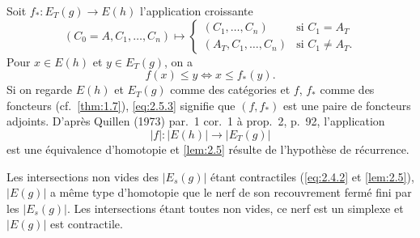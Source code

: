 \documentclass[11pt,a4paper]{article}
\theoremstyle{plain}
\theoremstyle{definition}
\begin{document}
Soit $f_* : E_T(g) \to E(h)$ l'application croissante
\begin{equation}\label{eq:2.5.2}
(C_0 = A, C_1, \ldots, C_n) \mapsto \begin{cases} (C_1, \ldots, C_n) & \text{si } C_1 = A_T \\ (A_T, C_1, \ldots, C_n) & \text{si } C_1 \not= A_T. \end{cases}
\tag{2.5.2}
\end{equation}
Pour $x \in E(h)$ et $y \in E_T(g)$, on a
\begin{equation}\label{eq:2.5.3}
f(x) \leq y \iff x \leq f_*(y).
\tag{2.5.3}
\end{equation}
Si on regarde $E(h)$ et $E_T(g)$ comme des cat\'egories et $f$, $f_*$ comme des foncteurs (cf.~\ref{thm:1.7}), \eqref{eq:2.5.3} signifie que $(f, f_*)$ est une paire de foncteurs adjoints. D'apr\`es Quillen (1973) par.~1 cor.~1 \`a prop.~2, p.~92, l'application
\[
|f| : |E(h)| \to |E_T(g)|
\]
est une \'equivalence d'homotopie et \ref{lem:2.5} r\'esulte de l'hypoth\`ese de r\'ecurrence.

Les intersections non vides des $|E_s(g)|$ \'etant contractiles (\eqref{eq:2.4.2} et \ref{lem:2.5}), $|E(g)|$ a m\^eme type d'homotopie que le nerf de son recouvrement ferm\'e fini par les $|E_s(g)|$. Les intersections \'etant toutes non vides, ce nerf est un simplexe et $|E(g)|$ est contractile.
\end{document}

